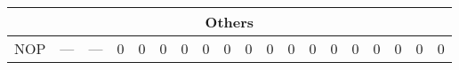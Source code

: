 \documentclass[a4paper,10pt]{article}
\begin{document}
\begin{landscape}
\begin{longtable}[c]{|c|c|@{}c@{}|@{}c@{}|@{}c@{}|@{}c@{}|@{}c@{}|@{}c@{}|@{}c@{}|@{}c@{}|@{}c@{}|@{}c@{}|@{}c@{}|@{}c@{}|@{}c@{}|@{}c@{}|@{}c@{}|@{}c@{}|@{}c@{}|@{}c@{}|@{}c@{}|@{}c@{}|@{}c@{}|@{}c@{}|@{}c@{}|@{}c@{}|}
\hline
\multicolumn{26}{|c|}{Others}                                                                                                                                                                                                                                                                    \\\hline
NOP                   &                   ---                                               & \multicolumn{8}{c|}{---}                                   & 0      & 0    & 0    & 0   & 0    & 0  & 0  & 0  & 0                & 0              & 0 & 0 & 0 & 0 & 0 & 0\\\hline
\end{longtable}
\end{landscape}
\end{document}
